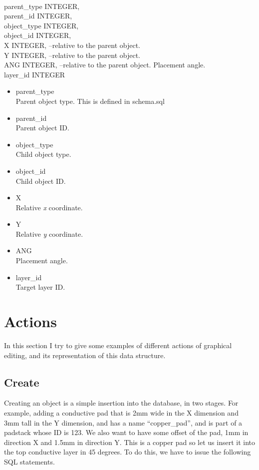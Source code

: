 \documentclass[12pt]{article}
\begin{document}
\mbox{}\\

parent\_type INTEGER,\\
parent\_id INTEGER,\\
object\_type INTEGER,\\
object\_id INTEGER,\\
X INTEGER, --relative to the parent object.\\
Y INTEGER, --relative to the parent object.\\
ANG INTEGER, --relative to the parent object. Placement angle.\\
layer\_id INTEGER

\begin{itemize}
\item parent\_type\\
Parent object type. This is defined in schema.sql
\item parent\_id\\
Parent object ID.
\item object\_type\\
Child object type.
\item object\_id\\
Child object ID.
\item X\\
Relative \emph{x} coordinate.
\item Y\\
Relative \emph{y} coordinate.
\item ANG\\
Placement angle.
\item layer\_id\\
Target layer ID.
\end{itemize}

\section{Actions}

In this section I try to give some examples of different actions of graphical
editing, and its representation of this data structure.

\subsection{Create}

Creating an object is a simple insertion into the database, in two stages. For
example, adding a conductive pad that is 2mm wide in the X dimension and 3mm
tall in the Y dimension, and has a name ``copper\_pad'', and is part of a
padstack whose ID is 123. We also want to have some offset of the pad, 1mm in
direction X and 1.5mm in direction Y. This is a copper pad so let us insert it
into the top conductive layer in 45 degrees. To do this, we have to issue the
following SQL statements.
\end{document}
